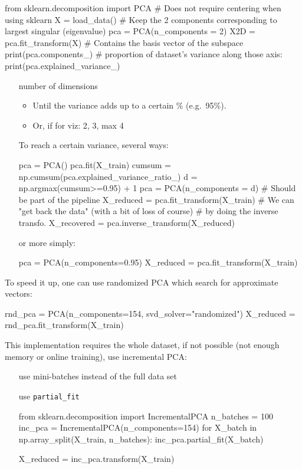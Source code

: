 \begin{python}
    from sklearn.decomposition import PCA
    # Does not require centering when using sklearn
    X = load_data()
    # Keep the 2 components corresponding to largest singular (eigenvalue)
    pca = PCA(n_components = 2)
    X2D = pca.fit_transform(X)
    # Contains the basis vector of the subspace
    print(pca.components_)
    # proportion of dataset's variance along those axis:
    print(pca.explained_variance_)
\end{python}

\begin{enumerate}
    \item [number of dimensions] \hfill\\
        \begin{itemize}
            \item Until the variance adds up to a certain \% (e.g.\ 95\%).\\
            \item Or, if for viz: 2, 3, max 4
        \end{itemize}
        To reach a certain variance, several ways:
        \begin{python}
            pca = PCA()
            pca.fit(X_train)
            cumsum = np.cumsum(pca.explained_variance_ratio_)
            d = np.argmax(cumsum>=0.95) + 1
            pca = PCA(n_components = d)     # Should be part of the pipeline
            X_reduced = pca.fit_transform(X_train)
            # We can "get back the data" (with a bit of loss of course)
            # by doing the inverse transfo.
            X_recovered = pca.inverse_transform(X_reduced)
        \end{python}
        or more simply:
        \begin{python}
            pca = PCA(n_components=0.95)
            X_reduced = pca.fit_transform(X_train)
        \end{python}
\end{enumerate}
To speed it up, one can use randomized PCA which search for approximate vectors:
\begin{python}
    rnd_pca = PCA(n_components=154, svd_solver="randomized")
    X_reduced = rnd_pca.fit_transform(X_train)
\end{python}

This implementation requires the whole dataset, if not possible (not enough memory or online training), use incremental PCA:
\begin{itemize}
    \item[\arrow] use mini-batches instead of the full data set
    \item[\Arrow] use \verb;partial_fit;
        \begin{python}
            from sklearn.decomposition import IncrementalPCA
            n_batches = 100
            inc_pca = IncrementalPCA(n_components=154)
            for X_batch in np.array_split(X_train, n_batches):
                inc_pca.partial_fit(X_batch)

            X_reduced = inc_pca.transform(X_train)
        \end{python}
\end{itemize}

